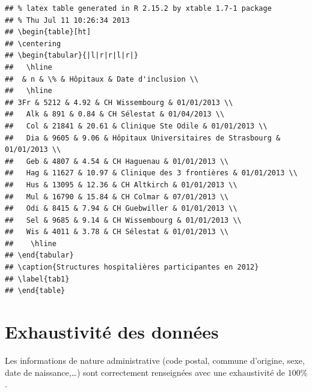 \documentclass[12pt,english,french]{report}\usepackage{graphicx, color}
\makeatletter
\newenvironment{kframe}{%
 \def\at@end@of@kframe{}%
 \ifinner\ifhmode%
  \def\at@end@of@kframe{\end{minipage}}%
  \begin{minipage}{\columnwidth}%
 \fi\fi%
 \def\FrameCommand##1{\hskip\@totalleftmargin \hskip-\fboxsep
 \colorbox{shadecolor}{##1}\hskip-\fboxsep
     \hskip-\linewidth \hskip-\@totalleftmargin \hskip\columnwidth}%
 \MakeFramed {\advance\hsize-\width
   \@totalleftmargin\z@ \linewidth\hsize
   \@setminipage}}%
 {\par\unskip\endMakeFramed%
 \at@end@of@kframe}
\newenvironment{knitrout}{}{} %
\makeatother
\begin{document}
\begin{knitrout}
\color{fgcolor}\begin{kframe}


{\ttfamily\noindent\color{warningcolor}{\#\# Warning: number of rows of result is not a multiple of vector length (arg 3)}}\begin{verbatim}
## % latex table generated in R 2.15.2 by xtable 1.7-1 package
## % Thu Jul 11 10:26:34 2013
## \begin{table}[ht]
## \centering
## \begin{tabular}{|l|r|r|l|r|}
##   \hline
##  & n & \% & Hôpitaux & Date d'inclusion \\ 
##   \hline
## 3Fr & 5212 & 4.92 & CH Wissembourg & 01/01/2013 \\ 
##   Alk & 891 & 0.84 & CH Sélestat & 01/04/2013 \\ 
##   Col & 21841 & 20.61 & Clinique Ste Odile & 01/01/2013 \\ 
##   Dia & 9605 & 9.06 & Hôpitaux Universitaires de Strasbourg & 01/01/2013 \\ 
##   Geb & 4807 & 4.54 & CH Haguenau & 01/01/2013 \\ 
##   Hag & 11627 & 10.97 & Clinique des 3 frontières & 01/01/2013 \\ 
##   Hus & 13095 & 12.36 & CH Altkirch & 01/01/2013 \\ 
##   Mul & 16790 & 15.84 & CH Colmar & 07/01/2013 \\ 
##   Odi & 8415 & 7.94 & CH Guebwiller & 01/01/2013 \\ 
##   Sel & 9685 & 9.14 & CH Wissembourg & 01/01/2013 \\ 
##   Wis & 4011 & 3.78 & CH Sélestat & 01/01/2013 \\ 
##    \hline
## \end{tabular}
## \caption{Structures hospitalières participantes en 2012} 
## \label{tab1}
## \end{table}
\end{verbatim}
\end{kframe}
\end{knitrout}


\section{Exhaustivité des données}

Les informations de nature administrative (code postal, commune d'origine, sexe, date de naissance,\dots ) sont correctement renseignées avec une exhaustivité de $100\%$.
\end{document}
